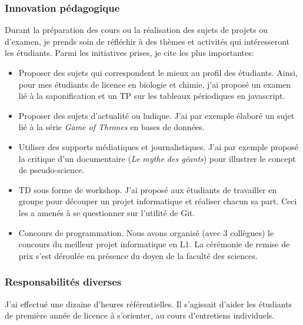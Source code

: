 \subsubsection*{Innovation pédagogique}

Durant la préparation des cours ou la réalisation des sujets de projets ou d'examen, je prends soin de réfléchir à des thèmes et activités qui intéresseront les étudiants. Parmi les initiatives prises, je cite les plus importantes: 

\begin{itemize}
\item Proposer des sujets qui correspondent le mieux au profil des étudiants. Ainsi, pour mes étudiants de licence en biologie et chimie, j'ai proposé un examen lié à la saponification et un TP sur les tableaux périodiques en javascript.
\item Proposer des sujets d'actualité ou ludique. J'ai par exemple élaboré un sujet lié à la série {\it Game of Thrones} en bases de données.
\item Utiliser des supports médiatiques et journalistiques. J'ai par exemple proposé la critique d'un documentaire ({\it Le mythe des géants}) pour illustrer le concept de pseudo-science.
\item TD sous forme de workshop. J'ai proposé aux étudiants de travailler en groupe pour découper un projet informatique et réaliser chacun sa part. Ceci les a amenés à se questionner sur l'utilité de Git.
\item Concours de programmation. Nous avons organisé (avec 3 collègues) le concours du meilleur projet informatique en L1. La cérémonie de remise de prix s'est déroulée en présence du doyen de la faculté des sciences. 
\end{itemize}

\subsubsection*{Responsabilités diverses}  

J'ai effectué une dizaine d'heures référentielles. Il s'agissait d'aider les étudiants de première année de licence à s'orienter, au cours d'entretiens individuels.  